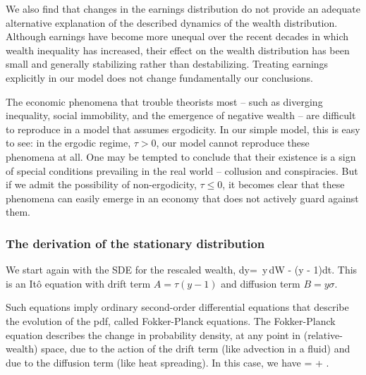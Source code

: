 We also find that changes in the earnings distribution do not provide an adequate alternative explanation of the described dynamics of the wealth distribution. Although earnings have become more unequal over the recent decades in which wealth inequality has increased, their effect on the wealth distribution has been small and generally stabilizing rather than destabilizing. Treating earnings explicitly in our model does not change fundamentally our conclusions.

The economic phenomena that trouble theorists most -- such as diverging inequality, social immobility, and the emergence of negative wealth -- are difficult to reproduce in a model that assumes ergodicity. In our simple model, this is easy to see: in the ergodic regime, $\tau>0$, our model cannot reproduce these phenomena at all. One may be tempted to conclude that their existence is a sign of special conditions prevailing in the real world -- collusion and conspiracies. But if we admit the possibility of non-ergodicity, $\tau\leq0$, it becomes clear that these phenomena can easily emerge in an economy that does not actively guard against them.

\subsubsection{The derivation of the stationary distribution}\label{app:stat}

We start again with the SDE for the rescaled wealth, 
\be
dy= \sigma\,y\,dW - \tau\left(y - 1\right)dt.
\ee
This is an It\^o equation with drift term 
$A=\tau(y - 1)$ and diffusion term $B=y \sigma$.

Such equations imply ordinary second-order differential equations that describe the evolution of the pdf, called Fokker-Planck equations. 
The Fokker-Planck equation describes the change in probability density, at any point in (relative-wealth) space, due to the action of the drift term (like advection in a fluid) and due to the diffusion term (like heat spreading). In this case, we have
\be
{}= + .
\ee

